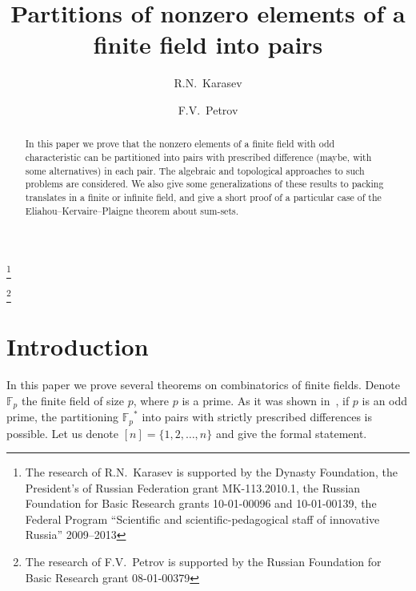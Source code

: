 \documentclass[12pt,a4paper]{amsart}
\theoremstyle{definition}
\theoremstyle{remark}
\begin{document}
\title{Partitions of nonzero elements of a finite field into pairs}

\author{R.N.~Karasev}

\thanks{The research of R.N.~Karasev is supported by the Dynasty Foundation,
the President's of Russian Federation grant MK-113.2010.1, the Russian Foundation for Basic Research grants 10-01-00096 and 10-01-00139, the Federal Program ``Scientific and scientific-pedagogical staff of innovative Russia'' 2009--2013}

\address{
Roman Karasev, Dept. of Mathematics, Moscow Institute of Physics
and Technology, Institutskiy per. 9, Dolgoprudny, Russia 141700}

\author{F.V.~Petrov}


\address{
Fedor Petrov, Saint-Petersburg Dept. of the Steklov Mathematical Institute, nab. Fontanki 27, Saint-Petersburg, Russia 191023}

\thanks{The research of F.V.~Petrov is supported by the Russian Foundation for Basic Research grant 08-01-00379}


\begin{abstract}
In this paper we prove that the nonzero elements of a finite field with odd characteristic can be partitioned into pairs with prescribed difference (maybe, with some alternatives) in each pair. The algebraic and topological approaches to such problems are considered. We also give some generalizations of these results to packing translates in a finite or infinite field, and give a short proof of a particular case of the Eliahou--Kervaire--Plaigne theorem about sum-sets.
\end{abstract}

\maketitle

\section{Introduction}

In this paper we prove several theorems on combinatorics of finite fields. Denote ${{\mathbb F_p}}$ the finite field of size $p$, where $p$ is a prime. As it was shown in~\cite{pm2009}, if $p$ is an odd prime, the partitioning ${{\mathbb F_p}}^*$ into pairs with strictly prescribed differences is possible. Let us denote $[n] = \{1,2,\ldots, n\}$ and give the formal statement.
\end{document}
